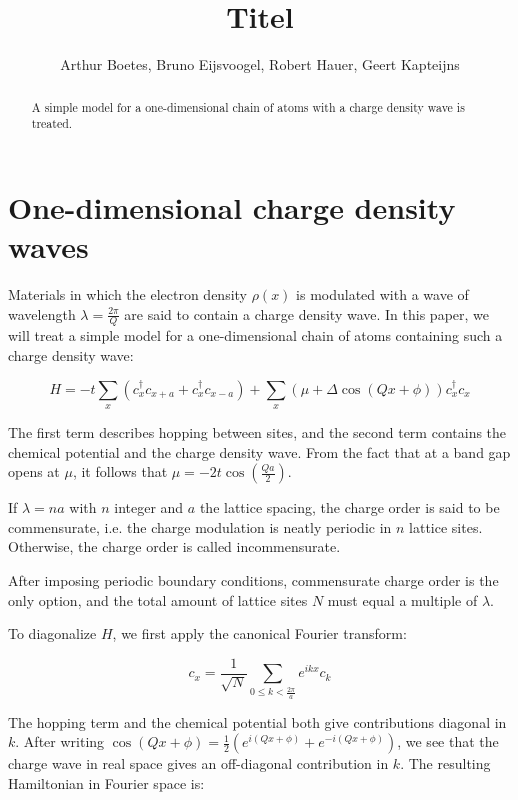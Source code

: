 \documentclass[letterpaper, 10 pt, conference]{ieeeconf}  %
\title{\LARGE \bf
  Titel
}
\author{Arthur Boetes, Bruno Eijsvoogel, Robert Hauer, Geert Kapteijns
}
\begin{document}
\maketitle
\thispagestyle{empty}
\pagestyle{empty}


\begin{abstract}

A simple model for a one-dimensional chain of atoms with a charge density wave is treated.

\end{abstract}


\section{One-dimensional charge density waves}

Materials in which the electron density $\rho(x)$ is modulated with a wave of
wavelength $\lambda = \frac{2\pi}{Q}$ are said to contain a charge density wave.
In this paper, we will treat a simple model for a one-dimensional chain of atoms containing such a charge density wave:

$$ H = -t \sum_x (c_x^{\dagger}c_{x+a} + c_x^{\dagger}c_{x-a}) + \sum_x (\mu + \Delta \cos(Qx + \phi))c_x^{\dagger}c_x $$

The first term describes hopping between sites, and the second term contains the chemical potential and the charge density wave. From the fact that at a band gap opens at $\mu$, it follows that $\mu = -2t\cos(\frac{Qa}{2})$.

If $\lambda = n a$ with $n$ integer and $a$ the lattice spacing, the charge order is said to be commensurate, i.e. the charge modulation is neatly periodic in $n$ lattice sites. Otherwise, the charge order is called incommensurate.

After imposing periodic boundary conditions, commensurate charge order is the only option, and the total amount of lattice sites $N$ must equal a multiple of $\lambda$.

To diagonalize $H$, we first apply the canonical Fourier transform:

$$c_x = \frac{1}{\sqrt{N}}\sum_{0 \leq k < \frac{2\pi}{a}}e^{ikx}c_k$$

The hopping term and the chemical potential both give contributions diagonal in $k$. After writing $\cos(Qx + \phi) = \frac{1}{2}(e^{i(Qx + \phi)} + e^{-i(Qx + \phi)}) $, we see that the charge wave in real space gives an off-diagonal contribution in $k$. The resulting Hamiltonian in Fourier space is:
\end{document}
